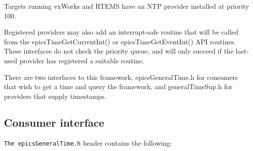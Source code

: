 Targets running vxWorks and RTEMS have an NTP provider installed at priority 100.

Registered providers may also add an interrupt-safe routine that will be called from the epicsTimeGetCurrentInt() or 
epicsTimeGetEventInt()  API routines. These interfaces do not check the priority queue, and will only succeed if the last-
used provider has registered a suitable routine.

There are two interfaces to this framework, epicsGeneralTime.h for consumers that wish to get a time and query the 
framework, and generalTimeSup.h for providers that supply timestamps.

\subsection{Consumer interface}

\verb|The epicsGeneralTime.h| header contains the following:

